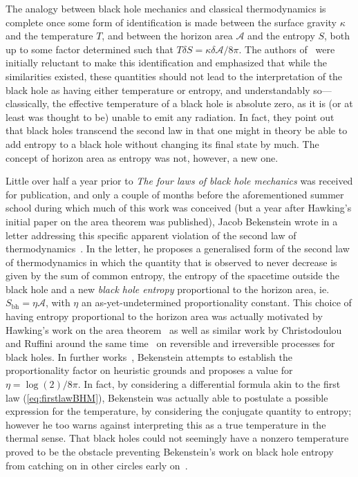 \documentclass[
twoside,
openright,
frontopenright
]{dmathesis}
\begin{document}
The analogy between black hole mechanics and classical thermodynamics is
complete once some form of identification is made between the surface gravity
$\kappa$ and the temperature $T$, and between the horizon area $\mathcal{A}$ and
the entropy $S$, both up to some factor determined such that
$T\delta S = \kappa \delta \mathcal{A} / 8\pi$. The authors
of~\cite{Bardeen:1973gs} were initially reluctant to make this identification
and emphasized that while the similarities existed, these quantities should not
lead to the interpretation of the black hole as having either temperature or
entropy, and understandably so---classically, the effective temperature of a
black hole is absolute zero, as it is (or at least was thought to be) unable to
emit any radiation. In fact, they point out that black holes transcend the
second law in that one might in theory be able to add entropy to a black hole
without changing its final state by much. The concept of horizon area as entropy
was not, however, a new one.

Little over half a year prior to \emph{The four laws of black hole mechanics}
was received for publication, and only a couple of months before the
aforementioned summer school during which much of this work was conceived (but a
year after Hawking's initial paper on the area theorem was published), Jacob
Bekenstein wrote in a letter addressing this specific apparent violation of the
second law of thermodynamics~\cite{Bekenstein:1972tm}. In the letter, he
proposes a generalised form of the second law of thermodynamics in which the
quantity that is observed to never decrease is given by the sum of common
entropy, the entropy of the spacetime outside the black hole and a new
\emph{black hole entropy} proportional to the horizon area, ie.
$S_{\mathrm{bh}}=\eta \mathcal{A}$, with $\eta$ an as-yet-undetermined
proportionality constant. This choice of having entropy proportional to the
horizon area was actually motivated by Hawking's work on the area
theorem~\cite{Hawking:1971tu} as well as similar work by Christodoulou and
Ruffini around the same time~\cite{Christodoulou:1970wf,Christodoulou:1972kt} on
reversible and irreversible processes for black holes. In further
works~\cite{Bekenstein:1973ur,Bekenstein:1974ax}, Bekenstein attempts to
establish the proportionality factor on heuristic grounds and proposes a value
for $\eta=\log(2)/8\pi$. In fact, by considering a differential formula akin to
the first law (\cref{eq:firstlawBHM}), Bekenstein was actually able to postulate
a possible expression for the temperature, by considering the conjugate quantity
to entropy; however he too warns against interpreting this as a true temperature
in the thermal sense. That black holes could not seemingly have a nonzero
temperature proved to be the obstacle preventing Bekenstein's work on black hole
entropy from catching on in other circles early on~\cite{10.2307/24953849}.
\end{document}
